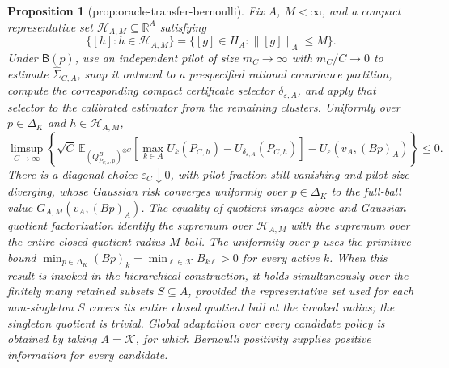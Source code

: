 \documentclass{article}
\newtheorem{proposition}{Proposition}
\begin{document}
\begin{proposition}[prop:oracle-transfer-bernoulli]\label{prop:oracle-transfer-bernoulli}
Fix \(A\), \(M<\infty\), and a compact representative set \(\mathscr H_{A,M}\subseteq\mathbb R^A\) satisfying
\[
\{[h]:h\in\mathscr H_{A,M}\}
=\{[g]\in H_A:\lVert[g]\rVert_A\leq M\}.
\]
Under \(\mathsf B(p)\), use an independent pilot of size \(m_C\to\infty\) with \(m_C/C\to0\) to estimate \(\widehat\Sigma_{C,A}\), snap it outward to a prespecified rational covariance partition, compute the corresponding compact certificate selector \(\delta_{\varepsilon,A}\), and apply that selector to the calibrated estimator from the remaining clusters.  Uniformly over \(p\in\Delta_K\) and \(h\in\mathscr H_{A,M}\),
\[
\limsup_{C\to\infty}\left\{\sqrt C\,\mathbb E_{(Q^B_{\bar P_{C,h},p})^{\otimes C}}
\left[\max_{k\in A}U_k(\bar P_{C,h})-U_{\delta_{\varepsilon,A}}(\bar P_{C,h})\right]
-U_\varepsilon(v_A,(Bp)_A)\right\}\leq0.
\]
There is a diagonal choice \(\varepsilon_C\downarrow0\), with pilot fraction still vanishing and pilot size diverging, whose Gaussian risk converges uniformly over \(p\in\Delta_K\) to the full-ball value \(G_{A,M}(v_A,(Bp)_A)\).  The equality of quotient images above and Gaussian quotient factorization identify the supremum over \(\mathscr H_{A,M}\) with the supremum over the entire closed quotient radius-\(M\) ball.  The uniformity over \(p\) uses the primitive bound \(\min_{p\in\Delta_K}(Bp)_k=\min_{\ell\in\mathcal K}B_{k\ell}>0\) for every active \(k\).  When this result is invoked in the hierarchical construction, it holds simultaneously over the finitely many retained subsets \(S\subseteq A\), provided the representative set used for each non-singleton \(S\) covers its entire closed quotient ball at the invoked radius; the singleton quotient is trivial.  Global adaptation over every candidate policy is obtained by taking \(A=\mathcal K\), for which Bernoulli positivity supplies positive information for every candidate.
\end{proposition}
\end{document}
